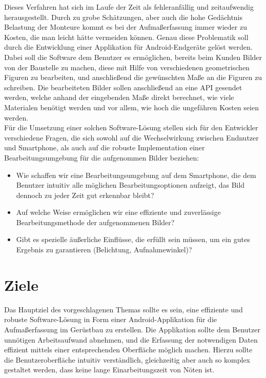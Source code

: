 \documentclass[a4paper]{article}
\begin{document}
Dieses Verfahren hat sich im Laufe der Zeit als fehleranfällig und zeitaufwendig herausgestellt.
Durch zu grobe Schätzungen, aber auch die hohe Gedächtnis Belastung der Monteure kommt es bei der Aufmaßerfassung immer wieder zu Kosten, die man leicht hätte vermeiden können.
Genau diese Problematik soll durch die Entwicklung einer Applikation für Android-Endgeräte gelöst werden. \\

Dabei soll die Software dem Benutzer es ermöglichen, bereits beim Kunden Bilder von der Baustelle zu machen, diese mit Hilfe von verschiedenen geometrischen Figuren zu bearbeiten, und anschließend die gewünschten Maße an die Figuren zu schreiben. 
Die bearbeiteten Bilder sollen anschließend an eine API gesendet werden, welche anhand der eingebenden Maße direkt berechnet, wie viele Materialen benötigt werden und vor allem, wie hoch die ungefähren Kosten seien werden.\\

Für die Umsetzung einer solchen Software-Lösung stellen sich für den Entwickler verschiedene Fragen, die sich sowohl auf die Wechselwirkung zwischen Endnutzer und Smartphone, als auch auf die robuste Implementation einer Bearbeitungsumgebung für die aufgenommen Bilder beziehen: \\

\begin{itemize}
	\item Wie schaffen wir eine Bearbeitungsumgebung auf dem Smartphone, die dem Benutzer intuitiv alle möglichen Bearbeitungsoptionen aufzeigt, das Bild dennoch zu jeder Zeit gut erkennbar bleibt?
	\item Auf welche Weise ermöglichen wir eine effiziente und zuverlässige Bearbeitungsmethode der aufgenommenen Bilder?
	\item Gibt es spezielle äußerliche Einflüsse, die erfüllt sein müssen, um ein gutes Ergebnis zu garantieren (Belichtung, Aufnahmewinkel)?
\end{itemize}

\newpage

\section*{Ziele}
Das Hauptziel des vorgeschlagenen Themas sollte es sein, eine effiziente und robuste Software-Lösung in Form einer Android-Applikation für die Aufmaßerfassung im Gerüstbau zu erstellen. 
Die Applikation sollte dem Benutzer unnötigen Arbeitsaufwand abnehmen, und die Erfassung der notwendigen Daten effizient mittels einer entsprechenden Oberfläche möglich machen.
Hierzu sollte die Benutzeroberfläche intuitiv verständlich, gleichzeitig aber auch so komplex gestaltet werden, dass keine lange Einarbeitungszeit von Nöten ist.
\end{document}
